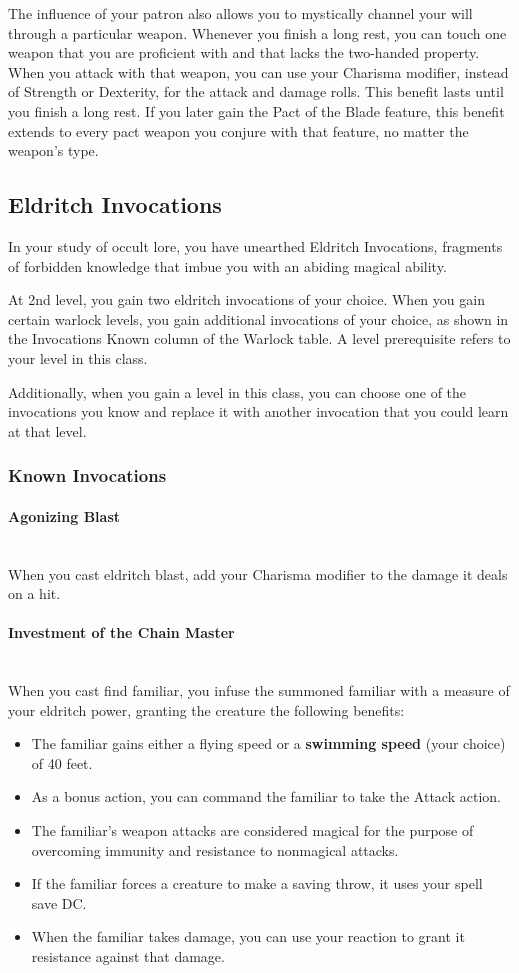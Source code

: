 {The influence of your patron also allows you to mystically channel your will through a particular weapon. Whenever you finish a long rest, you can touch one weapon that you are proficient with and that lacks the two-handed property. When you attack with that weapon, you can use your Charisma modifier, instead of Strength or Dexterity, for the attack and damage rolls. This benefit lasts until you finish a long rest. If you later gain the Pact of the Blade feature, this benefit extends to every pact weapon you conjure with that feature, no matter the weapon's type.

\subsection*{Eldritch Invocations}
In your study of occult lore, you have unearthed Eldritch Invocations, fragments of forbidden knowledge that imbue you with an abiding magical ability.

At 2nd level, you gain two eldritch invocations of your choice. When you gain certain warlock levels, you gain additional invocations of your choice, as shown in the Invocations Known column of the Warlock table. A level prerequisite refers to your level in this class.

Additionally, when you gain a level in this class, you can choose one of the invocations you know and replace it with another invocation that you could learn at that level.
\subsubsection*{Known Invocations}
\paragraph*{Agonizing Blast}\hfill\\
When you cast eldritch blast, add your Charisma modifier to the damage it deals on a hit.\\
\paragraph*{Investment of the Chain Master}\hfill\\
When you cast find familiar, you infuse the summoned familiar with a measure of your eldritch power, granting the creature the following benefits:
\begin{itemize}
	\item The familiar gains either a flying speed or a \textbf{swimming speed} (your choice) of 40 feet.
	\item As a bonus action, you can command the familiar to take the Attack action.
	\item The familiar's weapon attacks are considered magical for the purpose of overcoming immunity and resistance to nonmagical attacks.
	\item If the familiar forces a creature to make a saving throw, it uses your spell save DC.
	\item When the familiar takes damage, you can use your reaction to grant it resistance against that damage.
\end{itemize}
}
